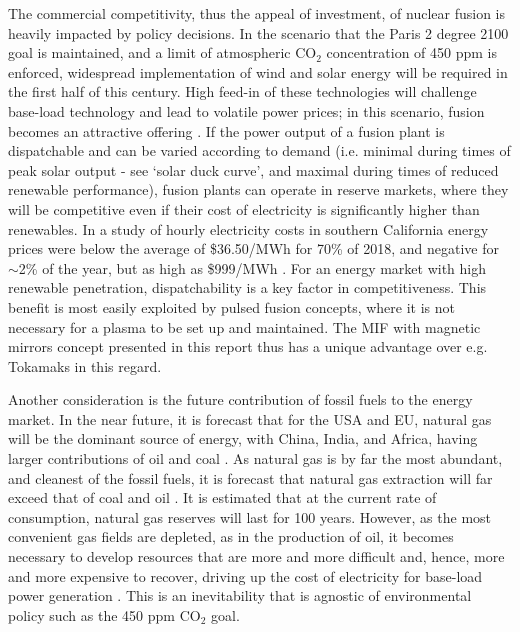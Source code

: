 The commercial competitivity, thus the appeal of investment, of nuclear fusion is heavily impacted by policy decisions. In the scenario that the Paris 2 degree 2100 goal is maintained, and a limit of atmospheric CO$_2$ concentration of 450 ppm is enforced, widespread implementation of wind and solar energy will be required in the first half of this century. High feed-in of these technologies will challenge base-load technology and lead to volatile power prices; in this scenario, fusion becomes an attractive offering \cite{klingelhofer2011financial}. If the power output of a fusion plant is dispatchable and can be varied according to demand (i.e. minimal during times of peak solar output - see ‘solar duck curve’, and maximal during times of reduced renewable performance), fusion plants can operate in reserve markets, where they will be competitive even if their cost of electricity is significantly higher than renewables. In a study of hourly electricity costs in southern California energy prices were below the average of \$36.50/MWh for 70\% of 2018, and negative for $\sim$2\% of the year, but as high as \$999/MWh \cite{EPRI2020}. For an energy market with high renewable penetration, dispatchability is a key factor in competitiveness. This benefit is most easily exploited by pulsed fusion concepts, where it is not necessary for a plasma to be set up and maintained.  The MIF with magnetic mirrors concept presented in this report thus has a unique advantage over e.g. Tokamaks in this regard.

Another consideration is the future contribution of fossil fuels to the energy market. In the near future, it is forecast that for the USA and EU, natural gas will be the dominant source of energy, with China, India, and Africa, having larger contributions of oil and coal \cite{kamani2023long}. As natural gas is by far the most abundant, and cleanest of the fossil fuels, it is forecast that natural gas extraction will far exceed that of coal and oil \cite{klingelhofer2011financial}. It is estimated that at the current rate of consumption, natural gas reserves will last for 100 years. However, as the most convenient gas fields are depleted, as in the production of oil, it becomes necessary to develop resources that are more and more difficult and, hence, more and more expensive to recover, driving up the cost of electricity for base-load power generation \cite{arutyunov2017energy}. This is an inevitability that is agnostic of environmental policy such as the 450 ppm CO$_2$ goal.


